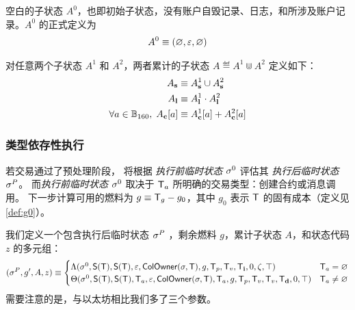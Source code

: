 空白的子状态 $A^0$，也即初始子状态，没有账户自毁记录、日志，和所涉及账户记录。$A^0$ 的正式定义为
\begin{align}
	A^0\equiv \left( \varnothing, \mathbb{\varepsilon}, \varnothing\right)
\end{align}

对任意两个子状态 $A^1$ 和 $A^2$，两者累计的子状态 $A\eqdef A^1\Cup A^2$ 定义如下：
\begin{align}
	A_{\bf s} &\equiv A^1_{\bf s} \cup A^2_{\bf s} \\ 
	A_{\bf l} &\equiv A^1_{\bf l} \cdot A^2_{\bf l} \\
	\forall a\in\mathbb{B}_{160},\; A_{\bf c}[a] & \equiv A^1_{\bf c}[a]+A^2_{\bf c}[a]
\end{align}


\subsubsection{类型依存性执行}

若交易通过了预处理阶段，
{\name} 将根据 \emph{执行前临时状态} $\mathbf{\sigma}^0$ 评估其 \emph{执行后临时状态} $\mathbf{\sigma}^P$。
而\emph{执行前临时状态} $\mathbf{\sigma}^0$ 取决于 $\textsf{T}_a$ 所明确的交易类型：创建合约或消息调用。
%
下一步计算可用的燃料为 $g\equiv \textsf{T}_g-g_0$，其中 $g_0$ 表示 $\textsf{T}$ 的固有成本（定义见 \ref{def:g0}）。

我们定义一个包含执行后临时状态 $\mathbf{\sigma}^{P}$ ，剩余燃料 $g$，累计子状态 $A$，和状态代码 $z$ 的多元组：
\begin{align}\label{def:transform}
	(\mathbf{\sigma}^{P},g',A,z)\equiv
	\begin{cases}
		\mathrm{\Lambda}(\mathbf{\sigma}^0,\mathsf{S}{\left({\textsf{T}} \right)},\mathsf{S}{\left({\textsf{T}} \right)},\mathbb{\varepsilon}, \mathsf{ColOwner}(\mathbf{\sigma},\textsf{T}),g,\textsf{T}_p,\textsf{T}_v,\textsf{T}_{\bf i},0,\zeta,\top) &  \textsf{T}_a=\varnothing \\
		\mathrm{\Theta}(\mathbf{\sigma}^0,\mathsf{S}{\left({\textsf{T}} \right)},\mathsf{S}{\left({\textsf{T}} \right)},\textsf{T}_a,\mathbb{\varepsilon},\mathsf{ColOwner}(\mathbf{\sigma},\textsf{T}),\textsf{T}_a,g,\textsf{T}_p,\textsf{T}_v,\textsf{T}_v,\textsf{T}_{\bf d},0,\top) & \textsf{T}_a\neq\varnothing
	\end{cases}
\end{align}
%
需要注意的是，与以太坊相比我们多了三个参数。

